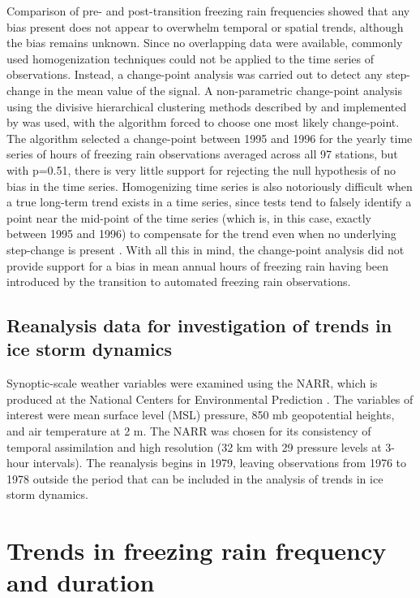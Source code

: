 \documentclass[twocol]{ametsoc}
\begin{document}
Comparison of pre- and post-transition freezing rain frequencies showed that any bias present does not appear to overwhelm temporal or spatial trends, although the bias remains unknown. Since no overlapping data were available, commonly used homogenization techniques could not be applied to the time series of observations. Instead, a change-point analysis was carried out to detect any step-change in the mean value of the signal. A non-parametric change-point analysis using the divisive hierarchical clustering methods described by \citet{matteson2014nonparametric} and implemented by \citet{james2013ecp} was used, with the algorithm forced to choose one most likely change-point. The algorithm selected a change-point between 1995 and 1996 for the yearly time series of hours of freezing rain observations averaged across all 97 stations, but with p=0.51, there is very little support for rejecting the null hypothesis of no bias in the time series. Homogenizing time series is also notoriously difficult when a true long-term trend exists in a time series, since tests tend to falsely identify a point near the mid-point of the time series (which is, in this case, exactly between 1995 and 1996) to compensate for the trend even when no underlying step-change is present \citep{gallagher2013changepoint}. With all this in mind, the change-point analysis did not provide support for a bias in mean annual hours of freezing rain having been introduced by the transition to automated freezing rain observations.

\subsection{Reanalysis data for investigation of trends in ice storm dynamics}
Synoptic-scale weather variables were examined using the NARR, which is produced at the National Centers for Environmental Prediction \citep{mesinger2006north}. The variables of interest were mean surface level (MSL) pressure, 850 mb geopotential heights, and air temperature at 2 m. The NARR was chosen for its consistency of temporal assimilation and high resolution (32 km with 29 pressure levels at 3-hour intervals). The reanalysis begins in 1979, leaving observations from 1976 to 1978 outside the period that can be included in the analysis of trends in ice storm dynamics.


\section{Trends in freezing rain frequency and duration}
\end{document}
